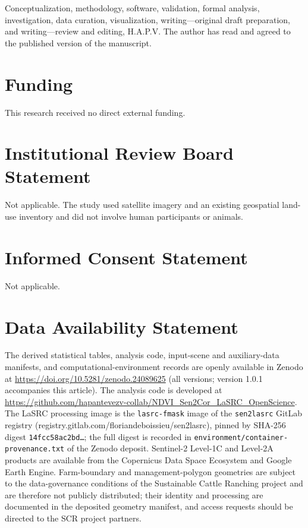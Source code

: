 \documentclass[remotesensing,article,submit,pdftex,oneauthor]{Definitions/mdpi}
\begin{document}
Conceptualization, methodology, software, validation, formal analysis,
investigation, data curation, visualization, writing---original draft
preparation, and writing---review and editing, H.A.P.V. The author has
read and agreed to the published version of the manuscript.

\section*{Funding}\label{funding}

This research received no direct external funding.

\section*{Institutional Review Board
Statement}\label{institutional-review-board-statement}

Not applicable. The study used satellite imagery and an existing
geospatial land-use inventory and did not involve human participants or
animals.

\section*{Informed Consent Statement}\label{informed-consent-statement}

Not applicable.

\section*{Data Availability
Statement}\label{data-availability-statement}

The derived statistical tables, analysis code, input-scene and
auxiliary-data manifests, and computational-environment records are
openly available in Zenodo at
\url{https://doi.org/10.5281/zenodo.24089625} (all versions; version
1.0.1 accompanies this article). The analysis code is developed at
\url{https://github.com/hapantevezv-collab/NDVI_Sen2Cor_LaSRC_OpenScience}.
The LaSRC processing image is the \texttt{lasrc-fmask} image of the
\texttt{sen2lasrc} GitLab registry
(registry.gitlab.com/floriandeboissieu/sen2lasrc), pinned by SHA-256
digest \texttt{14fcc58ac2bd…}; the full digest is recorded in
\texttt{environment/container-provenance.txt} of the Zenodo deposit.
Sentinel-2 Level-1C and Level-2A products are available from the
Copernicus Data Space Ecosystem and Google Earth Engine. Farm-boundary
and management-polygon geometries are subject to the data-governance
conditions of the Sustainable Cattle Ranching project and are therefore
not publicly distributed; their identity and processing are documented
in the deposited geometry manifest, and access requests should be
directed to the SCR project partners.
\end{document}
